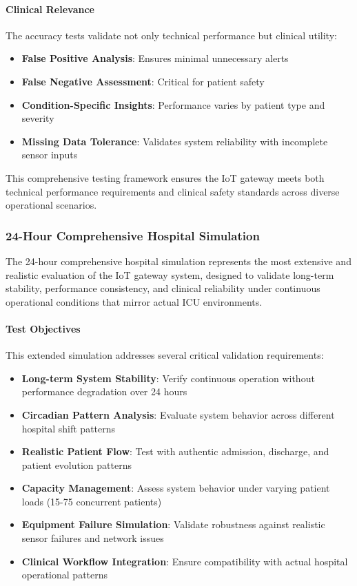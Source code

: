 \paragraph{Clinical Relevance}
The accuracy tests validate not only technical performance but clinical utility:

\begin{itemize}
    \item \textbf{False Positive Analysis}: Ensures minimal unnecessary alerts
    \item \textbf{False Negative Assessment}: Critical for patient safety
    \item \textbf{Condition-Specific Insights}: Performance varies by patient type and severity
    \item \textbf{Missing Data Tolerance}: Validates system reliability with incomplete sensor inputs
\end{itemize}

This comprehensive testing framework ensures the IoT gateway meets both technical performance requirements and clinical safety standards across diverse operational scenarios.

\subsubsection{24-Hour Comprehensive Hospital Simulation}

The 24-hour comprehensive hospital simulation represents the most extensive and realistic evaluation of the IoT gateway system, designed to validate long-term stability, performance consistency, and clinical reliability under continuous operational conditions that mirror actual ICU environments.

\paragraph{Test Objectives}
This extended simulation addresses several critical validation requirements:

\begin{itemize}
    \item \textbf{Long-term System Stability}: Verify continuous operation without performance degradation over 24 hours
    \item \textbf{Circadian Pattern Analysis}: Evaluate system behavior across different hospital shift patterns
    \item \textbf{Realistic Patient Flow}: Test with authentic admission, discharge, and patient evolution patterns
    \item \textbf{Capacity Management}: Assess system behavior under varying patient loads (15-75 concurrent patients)
    \item \textbf{Equipment Failure Simulation}: Validate robustness against realistic sensor failures and network issues
    \item \textbf{Clinical Workflow Integration}: Ensure compatibility with actual hospital operational patterns
\end{itemize}


